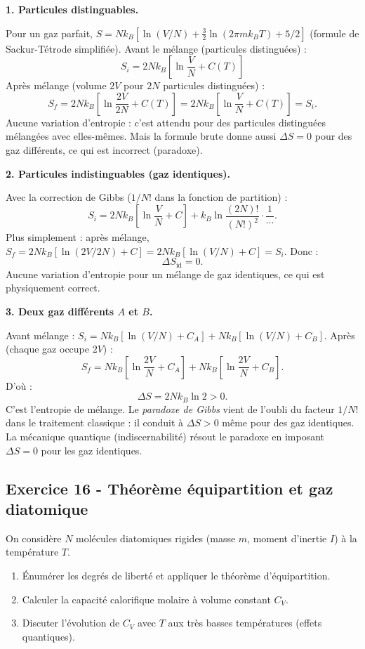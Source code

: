 \documentclass[12pt,a4paper]{article}
\begin{document}
\begin{boitecorrige}

\textbf{1. Particules distinguables.}

Pour un gaz parfait, $S = Nk_B[\ln(V/N) + \tfrac{3}{2}\ln(2\pi mk_BT) + 5/2]$ (formule de Sackur-Tétrode simplifiée). Avant le mélange (particules distinguées) :
\[
S_i = 2Nk_B\!\left[\ln\frac{V}{N} + C(T)\right]
\]
Après mélange (volume $2V$ pour $2N$ particules distinguées) :
\[
S_f = 2Nk_B\!\left[\ln\frac{2V}{2N} + C(T)\right] = 2Nk_B\!\left[\ln\frac{V}{N} + C(T)\right] = S_i.
\]
Aucune variation d'entropie : c'est attendu pour des particules distinguées mélangées avec elles-mêmes. Mais la formule brute donne aussi $\Delta S = 0$ pour des gaz différents, ce qui est incorrect (paradoxe).

\textbf{2. Particules indistinguables (gaz identiques).}

Avec la correction de Gibbs ($1/N!$ dans la fonction de partition) :
\[
S_i = 2Nk_B\!\left[\ln\frac{V}{N} + C\right] + k_B\ln\frac{(2N)!}{(N!)^2}\cdot\frac{1}{\cdots}.
\]
Plus simplement : après mélange, $S_f = 2Nk_B[\ln(2V/2N) + C] = 2Nk_B[\ln(V/N) + C] = S_i$. Donc :
\[
\Delta S_\text{id} = 0.
\]
Aucune variation d'entropie pour un mélange de gaz identiques, ce qui est physiquement correct.

\textbf{3. Deux gaz différents $A$ et $B$.}

Avant mélange : $S_i = Nk_B[\ln(V/N) + C_A] + Nk_B[\ln(V/N) + C_B]$. Après (chaque gaz occupe $2V$) :
\[
S_f = Nk_B\!\left[\ln\frac{2V}{N} + C_A\right] + Nk_B\!\left[\ln\frac{2V}{N} + C_B\right].
\]
D'où :
\[
\Delta S = 2Nk_B\ln 2 > 0.
\]
C'est l'entropie de mélange. Le \emph{paradoxe de Gibbs} vient de l'oubli du facteur $1/N!$ dans le traitement classique : il conduit à $\Delta S > 0$ même pour des gaz identiques. La mécanique quantique (indiscernabilité) résout le paradoxe en imposant $\Delta S = 0$ pour les gaz identiques.

\end{boitecorrige}

\subsection*{Exercice 16 - Théorème équipartition et gaz diatomique \niveau{\moyen}}

\begin{boiteexercice}
On considère $N$ molécules diatomiques rigides (masse $m$, moment d'inertie $I$) à la température $T$.
\begin{enumerate}
  \item Énumérer les degrés de liberté et appliquer le théorème d'équipartition.
  \item Calculer la capacité calorifique molaire à volume constant $C_V$.
  \item Discuter l'évolution de $C_V$ avec $T$ aux très basses températures (effets quantiques).
\end{enumerate}
\end{boiteexercice}
\end{document}
